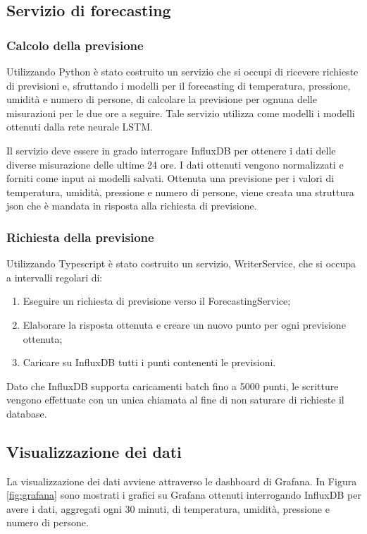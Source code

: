 \documentclass{article}
\begin{document}
\subsection{Servizio di forecasting}

\subsubsection{Calcolo della previsione}
Utilizzando Python è stato costruito un servizio che si occupi di ricevere richieste di previsioni e, sfruttando i modelli per il forecasting di temperatura, pressione, umidità e numero di persone, di calcolare la previsione per ognuna delle misurazioni per le due ore a seguire. Tale servizio utilizza come modelli i modelli ottenuti dalla rete neurale LSTM.

Il servizio deve essere in grado interrogare InfluxDB per ottenere i dati delle diverse misurazione delle ultime 24 ore. I dati ottenuti vengono normalizzati e forniti come input ai modelli salvati. Ottenuta una previsione per i valori di temperatura, umidità, pressione e numero di persone, viene creata una struttura json che è mandata in risposta alla richiesta di previsione.


\subsubsection{Richiesta della previsione}
Utilizzando Typescript è stato costruito un servizio, WriterService, che si occupa a intervalli regolari di:
\begin{enumerate}
    \item Eseguire un richiesta di previsione verso il ForecastingService;
    \item Elaborare la risposta ottenuta e creare un nuovo punto per ogni previsione ottenuta;
    \item Caricare su InfluxDB tutti i punti contenenti le previsioni.
\end{enumerate}

Dato che InfluxDB supporta caricamenti batch fino a 5000 punti, le scritture vengono effettuate con un unica chiamata al fine di non saturare di richieste il database.

\subsection{Visualizzazione dei dati}
La visualizzazione dei dati avviene attraverso le dashboard di Grafana. In Figura \ref{fig:grafana} sono mostrati i grafici su Grafana ottenuti interrogando InfluxDB per avere i dati, aggregati ogni 30 minuti, di temperatura, umidità, pressione e numero di persone.
\end{document}
